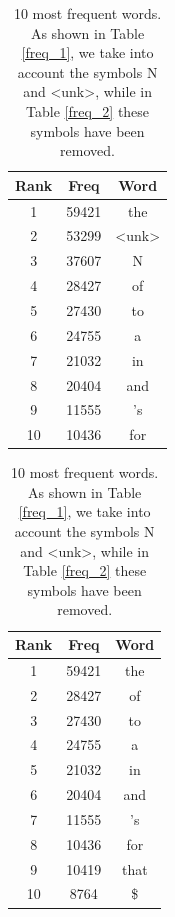 \documentclass[a4paper]{article}
\begin{document}
\begin{table}[h]
    \begin{minipage}{.5\linewidth}
     
        \centering
        \begin{tabular}{|c|c|c|}
            \hline
            Rank & Freq & Word\\
            \hline
            1 & 59421 & the\\
            \hline
            2 & 53299 & \textless unk\textgreater\\
            \hline
            3 & 37607 & N\\
            \hline
            4 & 28427 & of\\
            \hline
            5 & 27430 & to\\
            \hline
            6 & 24755 & a\\
            \hline
            7 & 21032 & in\\
            \hline
            8 & 20404 & and\\
            \hline
            9 & 11555 & 's\\
            \hline
            10 & 10436 & for\\
            \hline
        \end{tabular}
        \caption{}
        \label{freq_1}
    \end{minipage}%
    \begin{minipage}{.5\linewidth}
        \centering  
        \begin{tabular}{|c|c|c|}
            \hline
            Rank & Freq & Word\\
            \hline
            1 & 59421 & the\\
            \hline
            2 & 28427 & of\\
            \hline
            3 & 27430 & to\\
            \hline
            4 & 24755 & a\\
            \hline
            5 & 21032 & in\\
            \hline
            6 & 20404 & and\\
            \hline
            7 & 11555 & 's\\
            \hline
            8 & 10436 & for\\
            \hline
            9 & 10419 & that\\
            \hline
            10 & 8764 & \$\\
            \hline
        \end{tabular}
        \caption{}
        \label{freq_2}
    \end{minipage} 
    \caption{10 most frequent words. As shown in Table \ref{freq_1}, we take into account the symbols N and \textless unk\textgreater, while in Table \ref{freq_2} these symbols have been removed.}
    \label{tab: frequencies}
\end{table}
\\
\end{document}
